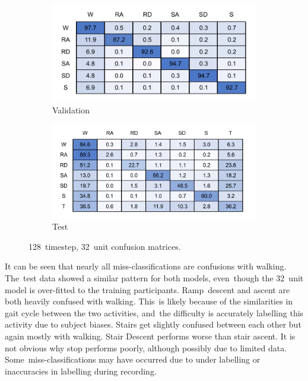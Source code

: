 \begin{figure}[!hbt]
    \centering
    \begin{subfigure}{.45\textwidth}
        \centering
        \includegraphics[width=\textwidth]{content/4-LSTM_Behaviour/results/conf_matricies/Training_128x32_NT.pdf}
	  \caption{Validation}
        \label{fig:full_model_conf_matrix_training_128x32}
    \end{subfigure}
    \begin{subfigure}{.45\textwidth}
        \centering
        \includegraphics[width=\textwidth]{content/4-LSTM_Behaviour/results/conf_matricies/Test_128x32_NT.pdf}
	 \caption{Test}
        \label{fig:full_model_conf_matrix_test_128x32}
    \end{subfigure}
    \caption{128~timestep, 32~unit confusion matrices.}
    \label{fig:128x32_full_model_confusion_matrix}
\end{figure}

It can be seen that nearly all miss-classifications are confusions with walking. The~test data showed a similar pattern for both models, even~though the 32~unit model is over-fitted to the training participants. Ramp~descent and ascent are both heavily confused with walking. This~is likely because of the similarities in gait cycle between the two activities, and~the difficulty is accurately labelling this activity due to subject biases. Stairs get slightly confused between each other but again mostly with walking. Stair Descent performs worse than stair ascent. It is not obvious why stop performs poorly, although possibly due to limited data. Some~miss-classifications may have occurred due to under labelling or inaccuracies in labelling during recording.

